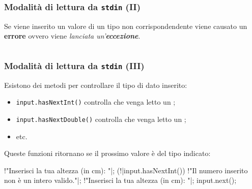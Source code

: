 \begin{frame}[fragile]\frametitle{Modalità di lettura da \texttt{stdin} (II)}

  Se viene inserito un valore di un tipo non corrispondendente viene causato
  un \textbf{errore} ovvero viene \emph{lanciata un'\textbf{eccezione}}.

  ${}$\\
  

\end{frame}

\begin{frame}[fragile]\frametitle{Modalità di lettura da \texttt{stdin} (III)}

  Esistono dei metodi per controllare il tipo di dato inserito:
  \begin{itemize}
   \item \texttt{input.hasNextInt()} \structure{$\Rightarrow$} controlla che venga letto un \Jint;
   \item \texttt{input.hasNextDouble()} \structure{$\Rightarrow$} controlla che venga letto un \Jdouble;
   \item etc.
  \end{itemize}

  Queste funzioni ritornano  se il prossimo valore è del tipo indicato:
  \begin{JavaCodePlain}[commandchars=\\!|]
    \Jprint!"Inserisci la tua altezza (in cm): "|;
    \Jwhile (\bang!|input.hasNextInt()) {
      \Jprintln!"Il numero inserito non è un intero valido."|;
      \Jprint!"Inserisci la tua altezza (in cm): "|;
      input.next();
    }   
  \end{JavaCodePlain}


\end{frame}

